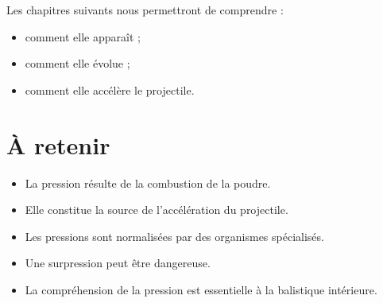 Les chapitres suivants nous permettront de comprendre :

\begin{itemize}
    \item comment elle apparaît ;
    \item comment elle évolue ;
    \item comment elle accélère le projectile.
\end{itemize}

\section{À retenir}

\begin{aretenir}

\begin{itemize}
    \item La pression résulte de la combustion de la poudre.
    \item Elle constitue la source de l'accélération du projectile.
    \item Les pressions sont normalisées par des organismes spécialisés.
    \item Une surpression peut être dangereuse.
    \item La compréhension de la pression est essentielle à la balistique
          intérieure.
\end{itemize}

\end{aretenir}
